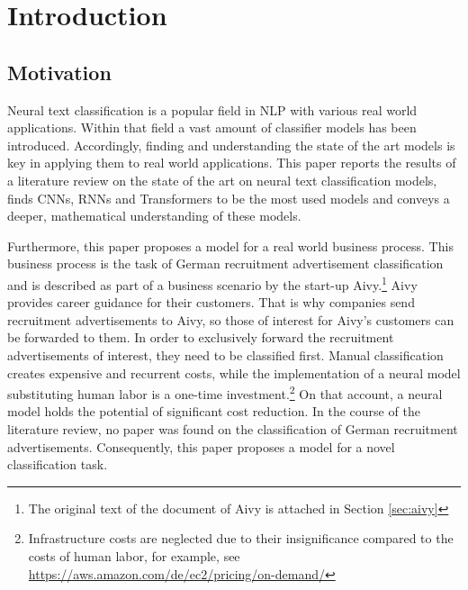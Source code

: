 \chapter{Introduction}
\section{Motivation}
Neural text classification is a popular field in \ac{NLP} with various real world applications. Within that field a vast amount of classifier models has been introduced.\autocites{Yang.2016}{Cho.2014}{Lee.2016}{Hochreiter.1997}{Kant.2018}{Zhou.2016}{Wang.2016}{Liang.2019}{Kim.2014}{Gao.2018}{Zhang.2015}{Johnson.2017}{Hoa.2017}{Yang.2018}{Rezaeinia.2018}{Zhao.2018}{Lai.2015}{Zheng.2019}{Johnson.2016}{Vaswani.2017}{Wang.2018b}{Iyyer.2015} Accordingly, finding and understanding the state of the art models is key in applying them to real world applications. This paper reports the results of a literature review on the state of the art on neural text classification models, finds \ac{CNN}s, \ac{RNN}s and Transformers to be the most used models and conveys a deeper, mathematical understanding of these models.
\par
Furthermore, this paper proposes a model for a real world business process. This business process is the task of German recruitment advertisement classification and is described as part of a business scenario by the start-up Aivy.\footnote{The original text of the document of Aivy is attached in Section \ref{sec:aivy}} Aivy provides career guidance for their customers. That is why companies send recruitment advertisements to Aivy, so those of interest for Aivy's customers can be forwarded to them. In order to exclusively forward the recruitment advertisements of interest, they need to be classified first. Manual classification creates expensive and recurrent costs, while the implementation of a neural model substituting human labor is a one-time investment.\footnote{Infrastructure costs are neglected due to their insignificance compared to the costs of human labor, for example, see \url{https://aws.amazon.com/de/ec2/pricing/on-demand/}} On that account, a neural model holds the potential of significant cost reduction. In the course of the literature review, no paper was found on the classification of German recruitment advertisements. Consequently, this paper proposes a model for a novel classification task.

